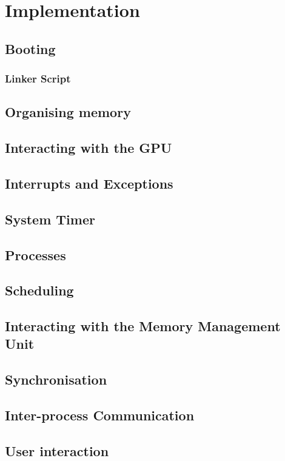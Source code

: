 \section{Implementation}
\subsection{Booting}
    \subsubsection{Linker Script}
        \label{sec:Linker}
\subsection{Organising memory}
\subsection{Interacting with the GPU}
\subsection{Interrupts and Exceptions}
\subsection{System Timer}
\subsection{Processes}
\subsection{Scheduling}
\subsection{Interacting with the Memory Management Unit}
\subsection{Synchronisation}
\subsection{Inter-process Communication}
\subsection{User interaction}
